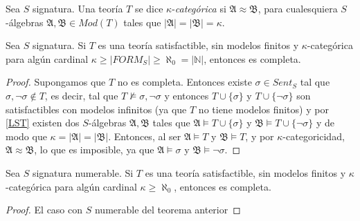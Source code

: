 \begin{definition}
Sea $S$ signatura. Una teoría $T$ se dice $\kappa$-\textit{categórica} si $\mathfrak{A} \approx \mathfrak{B}$,  para cualesquiera $S$-álgebras $\mathfrak{A}, \mathfrak{B} \in Mod(T)$ tales que $|\mathfrak{A}|= |\mathfrak{B}| = \kappa$.
\end{definition}

\begin{theorem}
Sea $S$ signatura. Si $T$ es una teoría satisfactible, sin modelos finitos y $\kappa$-categórica para algún cardinal $\kappa \geq|FORM_S|\geq\aleph_0=|\mathbb{N}|$, entonces es completa.
\end{theorem}
\begin{proof}
Supongamos que $T$ no es completa. Entonces existe $\sigma \in Sent_S$ tal que $\sigma, \neg\sigma \notin T$, es decir, tal que $T \nvDash \sigma, \neg\sigma$ y entonces $T\cup\{\sigma\}$ y $T\cup\{\neg\sigma\}$ son satisfactibles con modelos infinitos (ya que $T$ no tiene modelos finitos) y por \ref{LST} existen dos $S$-álgebras $\mathfrak{A}, \mathfrak{B}$ tales que $\mathfrak{A}\vDash T\cup \{\sigma\}$ y $\mathfrak{B}\vDash T\cup\{\neg\sigma\}$ y de modo que $\kappa = |\mathfrak{A}| = |\mathfrak{B}|$. Entonces, al ser $\mathfrak{A} \vDash T$ y $\mathfrak{B} \vDash T$, y por $\kappa$-categoricidad, $\mathfrak{A} \approx \mathfrak{B}$, lo que es imposible, ya que $\mathfrak{A}\vDash \sigma$ y $\mathfrak{B}\vDash \neg\sigma$.
\end{proof}
\begin{cor}
Sea $S$ signatura numerable. Si $T$ es una teoría satisfactible, sin modelos finitos y $\kappa$-categórica para algún cardinal $\kappa \geq\aleph_0$, entonces es completa.
\end{cor}
\begin{proof}
El caso con $S$ numerable del teorema anterior
\end{proof}

